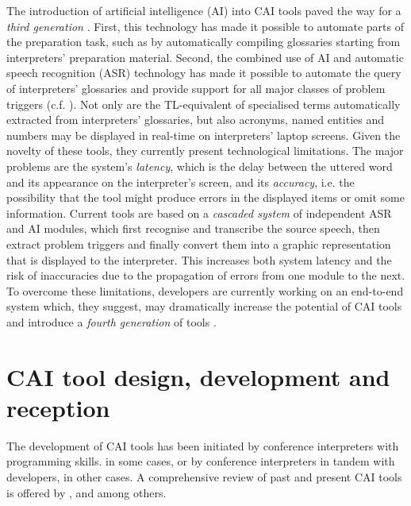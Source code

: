 The introduction of artificial intelligence (AI) into CAI tools paved the way for a \textit{third generation} \citep{eabm2021a,prandi2022a}. First, this technology has made it possible to automate parts of the preparation task, such as by automatically compiling glossaries starting from interpreters’ preparation material. Second, the combined use of AI and automatic speech recognition (ASR) technology has made it possible to automate the query of interpreters’ glossaries and provide support for all major classes of problem triggers (c.f. \cite{fantinuoli2017speech}). Not only are the TL-equivalent of specialised terms automatically extracted from interpreters’ glossaries, but also acronyms, named entities and numbers may be displayed in real-time on interpreters’ laptop screens. Given the novelty of these tools, they currently present technological limitations. The major problems are the system’s \textit{latency}, which is the delay between the uttered word and its appearance on the interpreter’s screen, and its \textit{accuracy}, i.e. the possibility that the tool might produce errors in the displayed items or omit some information. Current tools are based on a \textit{cascaded system} of independent ASR and AI modules, which first recognise and transcribe the source speech, then extract problem triggers and finally convert them into a graphic representation that is displayed to the interpreter. This increases both system latency and the risk of inaccuracies due to the propagation of errors from one module to the next. To overcome these limitations, developers are currently working on an end-to-end system which, they suggest, may dramatically increase the potential of CAI tools and introduce a \textit{fourth generation} of tools \citep{gaido2021moby}.








\section{CAI tool design, development and reception}

The development of CAI tools has been initiated by conference interpreters with programming skills. in some cases, or by conference interpreters in tandem with developers, in other cases. A comprehensive review of past and present CAI tools is offered by \citet{stoll2009jenseits,costa2014comparative,will2015eignung}, and \citet{fantinuoli2016interpretbank} among others.

